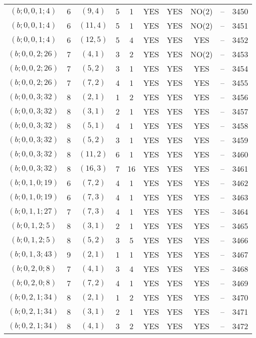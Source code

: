 \begin{longtable}{|c|c|c|c|c|c|c|c|c|c|}
$(b; 0, 0, 1; 4)$ & 6 & $(9, 4)$ & 5 & 1 & YES & YES & NO(2) & -- & 3450\\
$(b; 0, 0, 1; 4)$ & 6 & $(11, 4)$ & 5 & 1 & YES & YES & NO(2) & -- & 3451\\
$(b; 0, 0, 1; 4)$ & 6 & $(12, 5)$ & 5 & 4 & YES & YES & YES & -- & 3452\\
$(b; 0, 0, 2; 26)$ & 7 & $(4, 1)$ & 3 & 2 & YES & YES & NO(2) & -- & 3453\\
$(b; 0, 0, 2; 26)$ & 7 & $(5, 2)$ & 3 & 1 & YES & YES & YES & -- & 3454\\
$(b; 0, 0, 2; 26)$ & 7 & $(7, 2)$ & 4 & 1 & YES & YES & YES & -- & 3455\\
$(b; 0, 0, 3; 32)$ & 8 & $(2, 1)$ & 1 & 2 & YES & YES & YES & -- & 3456\\
$(b; 0, 0, 3; 32)$ & 8 & $(3, 1)$ & 2 & 1 & YES & YES & YES & -- & 3457\\
$(b; 0, 0, 3; 32)$ & 8 & $(5, 1)$ & 4 & 1 & YES & YES & YES & -- & 3458\\
$(b; 0, 0, 3; 32)$ & 8 & $(5, 2)$ & 3 & 1 & YES & YES & YES & -- & 3459\\
$(b; 0, 0, 3; 32)$ & 8 & $(11, 2)$ & 6 & 1 & YES & YES & YES & -- & 3460\\
$(b; 0, 0, 3; 32)$ & 8 & $(16, 3)$ & 7 & 16 & YES & YES & YES & -- & 3461\\
$(b; 0, 1, 0; 19)$ & 6 & $(7, 2)$ & 4 & 1 & YES & YES & YES & -- & 3462\\
$(b; 0, 1, 0; 19)$ & 6 & $(7, 3)$ & 4 & 1 & YES & YES & YES & -- & 3463\\
$(b; 0, 1, 1; 27)$ & 7 & $(7, 3)$ & 4 & 1 & YES & YES & YES & -- & 3464\\
$(b; 0, 1, 2; 5)$ & 8 & $(3, 1)$ & 2 & 1 & YES & YES & YES & -- & 3465\\
$(b; 0, 1, 2; 5)$ & 8 & $(5, 2)$ & 3 & 5 & YES & YES & YES & -- & 3466\\
$(b; 0, 1, 3; 43)$ & 9 & $(2, 1)$ & 1 & 1 & YES & YES & YES & -- & 3467\\
$(b; 0, 2, 0; 8)$ & 7 & $(4, 1)$ & 3 & 4 & YES & YES & YES & -- & 3468\\
$(b; 0, 2, 0; 8)$ & 7 & $(7, 2)$ & 4 & 1 & YES & YES & YES & -- & 3469\\
$(b; 0, 2, 1; 34)$ & 8 & $(2, 1)$ & 1 & 2 & YES & YES & YES & -- & 3470\\
$(b; 0, 2, 1; 34)$ & 8 & $(3, 1)$ & 2 & 1 & YES & YES & YES & -- & 3471\\
$(b; 0, 2, 1; 34)$ & 8 & $(4, 1)$ & 3 & 2 & YES & YES & YES & -- & 3472\\

\end{longtable}
